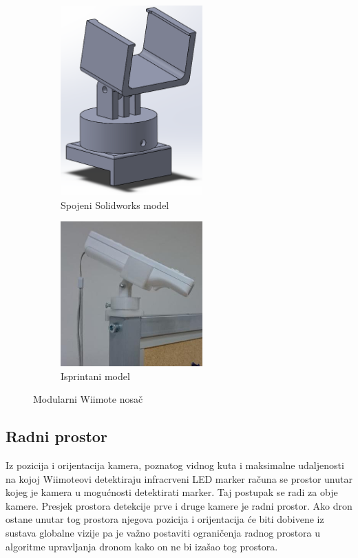 \documentclass[times, utf8, diplomski]{fer}
\begin{document}
\begin{figure}[h]
\begin{subfigure}[b]{.5\textwidth}
\centering
	\includegraphics[width=0.6\textwidth]{mehanizam}
	\caption{Spojeni Solidworks model}
	\label{fig:mehanizam1}
\end{subfigure}
\begin{subfigure}[b]{.5\textwidth}
	\centering
	\includegraphics[width=0.6\textwidth]{print}
	\caption{Isprintani model}
	\label{fig:mehanizam2}
\end{subfigure}
\caption{Modularni Wiimote nosač}
\label{fig:mehanizam}
\end{figure}

\subsection{Radni prostor}
Iz pozicija i orijentacija kamera, poznatog vidnog kuta i maksimalne udaljenosti na kojoj Wiimoteovi detektiraju infracrveni LED marker računa se prostor unutar kojeg je kamera u mogućnosti detektirati marker. Taj postupak se radi za obje kamere. Presjek prostora detekcije prve i druge kamere je radni prostor. Ako dron ostane unutar tog prostora njegova pozicija i orijentacija će biti dobivene iz sustava globalne vizije pa je važno postaviti ograničenja radnog prostora u algoritme upravljanja dronom kako on ne bi izašao tog prostora.
\end{document}
